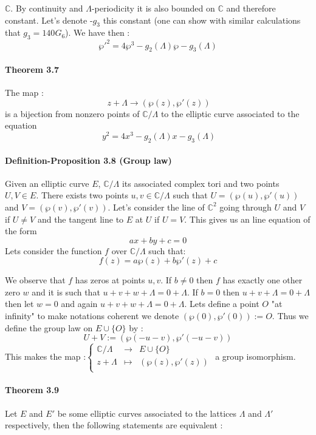 \documentclass[letterpaper,10pt]{article}
\begin{document}
 $\mathbb{C}$. By continuity and $\Lambda$-periodicity it is also bounded on $\mathbb{C}$ and therefore constant.
 Let's denote -$g_3$ this constant (one can show with similar calculations that $g_3 = 140G_6$). We have then :
  \[ \wp'^2 = 4\wp^3 - g_2(\Lambda)\wp - g_3(\Lambda)  \]

\paragraph{Theorem 3.7} The map : \[\ z + \Lambda \to (\wp(z),\wp'(z)) \]
is a bijection from nonzero points of $\mathbb{C} / \Lambda$ to the elliptic curve associated to the equation \[\ y^2 = 4x^3 - g_2(\Lambda)x - g_3(\Lambda) \]

\paragraph{Definition-Proposition 3.8 (Group law)} Given an elliptic curve $E$, $\mathbb{C}/\Lambda$ its associated complex tori and two points $U,V \in E$. There exists
two points $u,v\in\mathbb{C}/\Lambda $ such that $U=(\wp(u),\wp'(u))$ and $ V = (\wp(v),\wp'(v))$. Let's consider the line of $\mathbb{C}^2$ going 
through $U$ and $V$ if $U \neq V$ and the tangent line to $E$ at $U$ if $U=V$. This gives us an line equation of the form \[ ax+ by + c = 0  \]
Lets consider the function $f$ over $\mathbb{C}/\Lambda$ such that: \[ f(z) = a\wp(z) + b\wp'(z) + c \]

We observe that $f$ has zeros at points $u,v$.
If $ b \neq 0$ then $f$ has exactly one other zero $w$ and it is such that  $u + v + w + \Lambda = 0 + \Lambda$.
If $b = 0$ then $u + v + \Lambda = 0 + \Lambda$ then let $w = 0$ and again $u + v + w + \Lambda = 0 + \Lambda$.
Lets define a point $O$ "at infinity" to make notations coherent we denote $(\wp(0),\wp'(0)) := O$.
Thus we define the group law on $E\cup\{O\}$ by : \[ U + V := (\wp(-u - v),\wp'(-u -v)) \]
This makes the map :$  \left\{ \begin{array}{rcl} \mathbb{C}/\Lambda & \longrightarrow & E\cup \{O\} \\
  z + \Lambda & \longmapsto & (\wp(z),\wp'(z)) \\ \end{array} \right. $ a group isomorphism.



\paragraph{Theorem 3.9} Let $E$ and $E'$ be some elliptic curves associated to the lattices $\Lambda$ and $\Lambda'$ respectively,
then the following statements are equivalent :\\
\end{document}
